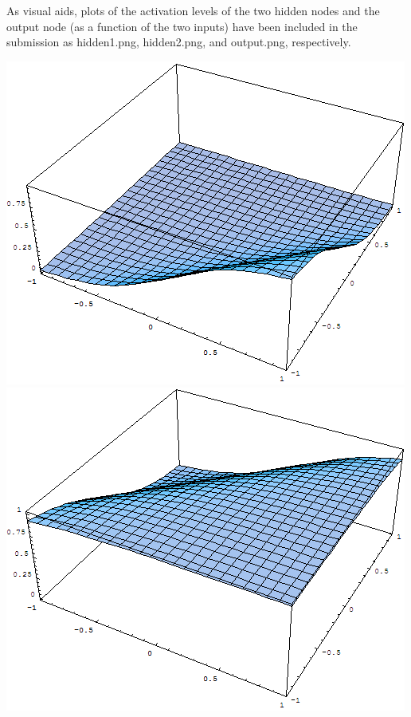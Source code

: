 \documentclass{article}
\begin{document}
\begin{enumerate}
    As visual aids, plots of the activation levels of the two hidden
    nodes and the output node (as a function of the two inputs) have
    been included in the submission as hidden1.png, hidden2.png, and
    output.png, respectively.

    \begin{center}
      \includegraphics[scale=.3]{hidden1.png}
      \includegraphics[scale=.3]{hidden2.png}

\end{center}
\end{enumerate}
\end{document}
